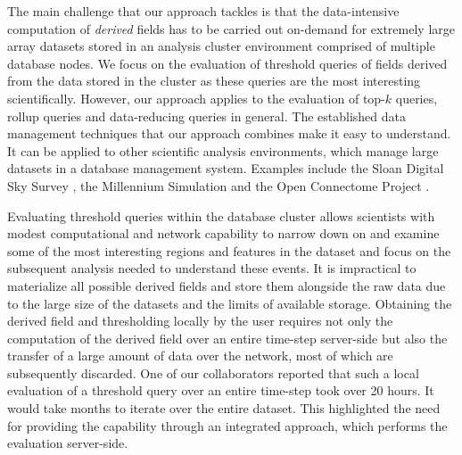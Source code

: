 \documentclass{sig-alternate}
\begin{document}
The main challenge that our approach tackles is that the
data-intensive computation of \emph{derived} fields has to be carried out on-demand for extremely large array datasets stored in an analysis cluster environment 
comprised of multiple database nodes. We focus on the evaluation of threshold queries of fields derived from the data stored in the cluster as
these queries are the most interesting scientifically. However, our approach applies to the evaluation of top-$k$ queries, rollup queries and data-reducing 
queries in general. The established data management techniques that our approach combines make it easy to understand. It can be applied to other 
scientific analysis environments, which manage large datasets in a database management system. Examples include the Sloan Digital Sky Survey
\cite{SDSS}, the Millennium Simulation \cite{Millennium} and the Open Connectome Project \cite{Burns}.

Evaluating threshold queries within the database cluster allows scientists with modest computational and network capability to narrow down on and
examine some of the most interesting regions and features in the dataset and focus on the subsequent analysis needed to understand these events.
It is impractical to materialize all possible derived fields and store them alongside the raw data
due to the large size of the datasets and the limits of available storage.
Obtaining the derived field and thresholding locally by the user requires not only the computation of the derived field over an entire time-step server-side 
but also the transfer of a large amount of data over the network, most of which are subsequently discarded. 
One of our collaborators reported that such a local evaluation of a threshold
query over an entire time-step took over 20 hours. It would take months to iterate over the entire dataset. 
This highlighted the need for providing the capability through an integrated approach, which performs the evaluation server-side.
\end{document}
